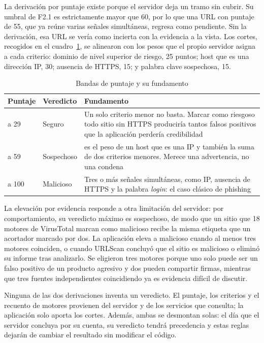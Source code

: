 La derivación por puntaje existe porque el servidor deja un tramo sin cubrir. Su umbral de F2.1 es estrictamente mayor que 60, por lo que una URL con puntaje de 55, que ya reúne varias señales simultáneas, regresa como pendiente. Sin la derivación, esa URL se vería como incierta con la evidencia a la vista. Los cortes, recogidos en el cuadro~\ref{tab:bandas}, se alinearon con los pesos que el propio servidor asigna a cada criterio: dominio de nivel superior de riesgo, 25 puntos; host que es una dirección IP, 30; ausencia de HTTPS, 15; y palabra clave sospechosa, 15.

\begin{table}[H]
	\centering
	\caption{Bandas de puntaje y su fundamento}
	\label{tab:bandas}
	\begin{tabular}{@{}>{\raggedright\arraybackslash}p{1.8cm}>{\raggedright\arraybackslash}p{2.2cm}>{\raggedright\arraybackslash}p{9cm}@{}}
		\toprule
		\textbf{Puntaje} & \textbf{Veredicto} & \textbf{Fundamento} \\
		\midrule
		0 a 29 & Seguro & Un solo criterio menor no basta. Marcar como riesgoso todo sitio sin HTTPS produciría tantos falsos positivos que la aplicación perdería credibilidad \\
		30 a 59 & Sospechoso & 30 es el peso de un host que es una IP y también la suma de dos criterios menores. Merece una advertencia, no una condena \\
		60 a 100 & Malicioso & Tres o más señales simultáneas, como IP, ausencia de HTTPS y la palabra \emph{login}: el caso clásico de phishing \\
		\bottomrule
	\end{tabular}
\end{table}

La elevación por evidencia responde a otra limitación del servidor: por comportamiento, su veredicto máximo es sospechoso, de modo que un sitio que 18 motores de VirusTotal marcan como malicioso recibe la misma etiqueta que un acortador marcado por dos. La aplicación eleva a malicioso cuando al menos tres motores coinciden, o cuando URLScan concluyó que el sitio es malicioso o eliminó su informe tras analizarlo. Se eligieron tres motores porque uno solo puede ser un falso positivo de un producto agresivo y dos pueden compartir firmas, mientras que tres fuentes independientes coincidiendo ya es evidencia difícil de discutir.

Ninguna de las dos derivaciones inventa un veredicto. El puntaje, los criterios y el recuento de motores provienen del servidor y de los servicios que consulta; la aplicación solo aporta los cortes. Además, ambas se desmontan solas: el día que el servidor concluya por su cuenta, su veredicto tendrá precedencia y estas reglas dejarán de cambiar el resultado sin modificar el código.

